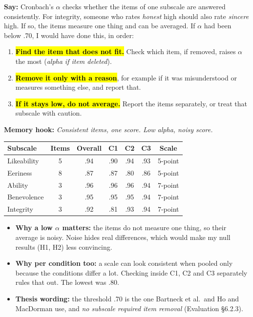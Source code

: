 \documentclass[11pt,a4paper]{article}
\newcommand{\key}[1]{\hl{#1}}
\newcommand{\hook}[1]{{\setlength{\fboxsep}{1.5pt}\colorbox{hlyellow}{\color{black}#1}}}
\newcommand{\say}[1]{\begin{tcolorbox}[colback=knlight,colframe=knblue,boxrule=0.5pt,left=6pt,right=6pt,top=4pt,bottom=4pt]\textbf{Say:} #1\end{tcolorbox}}
\begin{document}
\say{Cronbach's $\alpha$ checks whether the items of one subscale are answered consistently. For integrity, someone who rates \emph{honest} high should also rate \emph{sincere} high. If so, the items measure one thing and can be averaged. If $\alpha$ had been below .70, I would have done this, in order:
\begin{enumerate}[leftmargin=1.4em,itemsep=0.1em,topsep=0.2em]
  \item \key{\textbf{Find the item that does not fit.}} Check which item, if removed, raises $\alpha$ the most (\emph{alpha if item deleted}).
  \item \key{\textbf{Remove it only with a reason}}, for example if it was misunderstood or measures something else, and report that.
  \item \key{\textbf{If it stays low, do not average.}} Report the items separately, or treat that subscale with caution.
\end{enumerate}}

{\small\color{kngrey}\textbf{Memory hook:} \hook{\emph{Consistent items, one score. Low alpha, noisy score.}}}

{\small
\renewcommand{\arraystretch}{1.2}
\begin{tabular}{@{}lcccccc@{}}
\toprule
\textbf{Subscale} & \textbf{Items} & \textbf{Overall} & \textbf{C1} & \textbf{C2} & \textbf{C3} & \textbf{Scale} \\
\midrule
Likeability & 5 & .94 & .90 & .94 & .93 & 5-point \\
Eeriness    & 8 & .87 & .87 & .80 & .86 & 5-point \\
Ability     & 3 & .96 & .96 & .96 & .94 & 7-point \\
Benevolence & 3 & .95 & .95 & .95 & .94 & 7-point \\
Integrity   & 3 & .92 & .81 & .93 & .94 & 7-point \\
\bottomrule
\end{tabular}\par}
\vspace{0.3em}

\begin{itemize}
  \item \textbf{Why a low $\alpha$ matters:} the items do not measure one thing, so their average is noisy. Noise hides real differences, which would make my null results (H1, H2) less convincing.
  \item \textbf{Why per condition too:} a scale can look consistent when pooled only because the conditions differ a lot. Checking inside C1, C2 and C3 separately rules that out. The lowest was .80.
  \item \textbf{Thesis wording:} the threshold .70 is the one Bartneck et al.\ and Ho and MacDorman use, and \emph{no subscale required item removal} (Evaluation §6.2.3).
\end{itemize}
\end{document}
